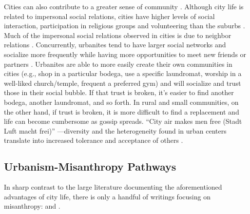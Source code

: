\documentclass[11pt, letterpaper]{article}
\begin{document}
\begin{spacing}{1.4}
 Cities can also contribute to a greater sense
 of community \citep[]{chavis2002sense,macke2019smart}. 
 Although city life is related to impersonal social relations, cities have higher levels of social interaction, participation in religious groups and volunteering than the suburbs \citep{nguyen10,mazumdar18}.    
 Much of the impersonal social relations observed in cities is due to neighbor
relations \citep{nguyen10,mazumdar18}. Concurrently, urbanites tend to have
larger social networks and socialize more frequently while having more
opportunities to meet new friends or partners
\citep{mouratidis18,anon17-cities-oslo}.
Urbanites are able to more easily
create their own communities in cities (e.g., shop in a particular bodega, use a
specific laundromat, worship in a well-liked church/temple, frequent a preferred
gym) and will socialize and trust those in their social bubble. If that trust is
broken, it's easier to find another bodega, another laundromat, and so forth. {In rural and small communities, on the other hand, if trust is broken, it is more difficult to find a replacement and life can become cumbersome as gossip spreads.}
``City air makes men free (Stadt Luft macht frei)'' \citep[p.12]{park84}---diversity and the heterogeneity found in urban centers translate into increased tolerance and acceptance of others \citep{tuch87,wirth38,stephan82,aok20}.





\subsection*{Urbanism-Misanthropy Pathways}

In sharp contrast to the large literature documenting the aforementioned advantages of city life, there is only a handful of writings focusing on misanthropy: 
\cite{thrift05,melgar13,keeling13,smith97,bloch87,wilson85,ray81,gibson17} and \citet{rosenberg57,rosenberg56}.


\end{spacing}
\end{document}
